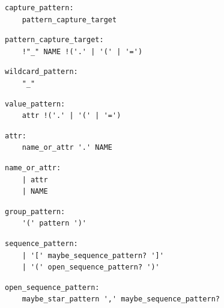 \noindent\textbf{\texttt{}}\par
\begin{lstlisting}
capture_pattern:
    pattern_capture_target
\end{lstlisting}

\noindent\textbf{\texttt{}}\par
\begin{lstlisting}
pattern_capture_target:
    !"_" NAME !('.' | '(' | '=')
\end{lstlisting}

\noindent\textbf{\texttt{}}\par
\begin{lstlisting}
wildcard_pattern:
    "_"
\end{lstlisting}

\noindent\textbf{\texttt{}}\par
\begin{lstlisting}
value_pattern:
    attr !('.' | '(' | '=')
\end{lstlisting}

\noindent\textbf{\texttt{}}\par
\begin{lstlisting}
attr:
    name_or_attr '.' NAME
\end{lstlisting}

\noindent\textbf{\texttt{}}\par
\begin{lstlisting}
name_or_attr:
    | attr
    | NAME
\end{lstlisting}

\noindent\textbf{\texttt{}}\par
\begin{lstlisting}
group_pattern:
    '(' pattern ')'
\end{lstlisting}

\noindent\textbf{\texttt{}}\par
\begin{lstlisting}
sequence_pattern:
    | '[' maybe_sequence_pattern? ']'
    | '(' open_sequence_pattern? ')'
\end{lstlisting}

\noindent\textbf{\texttt{}}\par
\begin{lstlisting}
open_sequence_pattern:
    maybe_star_pattern ',' maybe_sequence_pattern?
\end{lstlisting}

